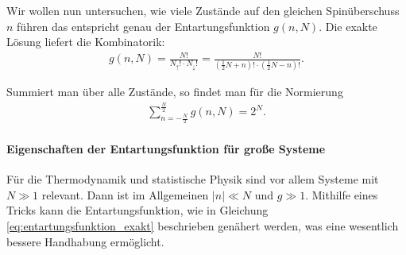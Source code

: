 Wir wollen nun untersuchen, wie viele Zustände auf den gleichen Spinüberschuss $n$ führen \textendash{} das entspricht genau der Entartungsfunktion $g(n,N)$. Die exakte Lösung liefert die Kombinatorik:
\begin{align}
    \label{eq:entartungsfunktion_exakt}
    g(n,N) = \frac{N!}{N_\uparrow!\cdot N_\downarrow!} = \frac{N!}{\left(\frac{1}{2}N+n\right)!\cdot \left( \frac{1}{2}N-n \right)!}.
\end{align}

Summiert man über alle Zustände, so findet man für die Normierung 
\begin{align*}
    \sum_{n=-\frac{N}{2}}^{\frac{N}{2}}g(n,N) = 2^N. 
\end{align*}


\paragraph*{Eigenschaften der Entartungsfunktion für große Systeme}

Für die Thermodynamik und statistische Physik sind vor allem Systeme mit $N\gg 1$ relevant. Dann ist im Allgemeinen $|n|\ll N$ und $g\gg 1$. Mithilfe eines Tricks kann die Entartungsfunktion, wie in Gleichung \eqref{eq:entartungsfunktion_exakt} beschrieben genähert werden, was eine wesentlich bessere Handhabung ermöglicht.

